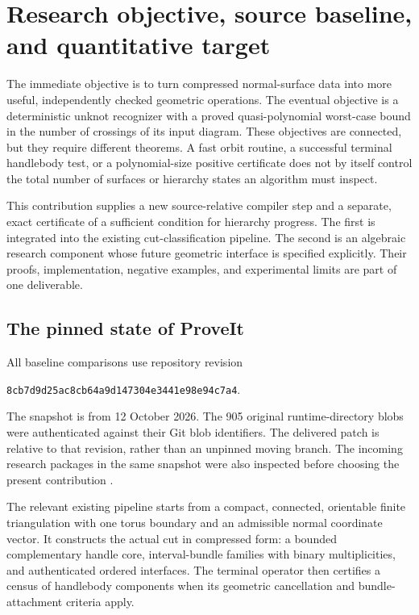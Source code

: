 \section{Research objective, source baseline, and quantitative target}
\label{sec:context}

The immediate objective is to turn compressed normal-surface data into more
useful, independently checked geometric operations. The eventual objective
is a deterministic unknot recognizer with a proved quasi-polynomial
worst-case bound in the number of crossings of its input diagram. These
objectives are connected, but they require different theorems. A fast orbit
routine, a successful terminal handlebody test, or a polynomial-size positive
certificate does not by itself control the total number of surfaces or
hierarchy states an algorithm must inspect.

This contribution supplies a new source-relative compiler step and a
separate, exact certificate of a sufficient condition for hierarchy progress.
The first is integrated into the existing cut-classification pipeline. The
second is an algebraic research component whose future geometric interface
is specified explicitly. Their proofs, implementation, negative examples,
and experimental limits are part of one deliverable.

\subsection{The pinned state of ProveIt}

All baseline comparisons use repository revision
\begin{center}
\texttt{8cb7d9d25ac8cb64a9d147304e3441e98e94c7a4}.
\end{center}
The snapshot is from 12 October 2026. The 905 original runtime-directory
blobs were authenticated against their Git
blob identifiers. The delivered patch is relative to that revision, rather
than an unpinned moving branch. The incoming research packages in the same
snapshot were also inspected before choosing the present contribution
\cite{repo,prior-genus,prior-stopping,prior-saturated,prior-hierarchy,prior-sparse}.

The relevant existing pipeline starts from a compact, connected, orientable
finite triangulation with one torus boundary and an admissible normal
coordinate vector. It constructs the actual cut in compressed form:
a bounded complementary handle core, interval-bundle families with binary
multiplicities, and authenticated ordered interfaces. The terminal operator
then certifies a census of handlebody components when its geometric
cancellation and bundle-attachment criteria apply.

